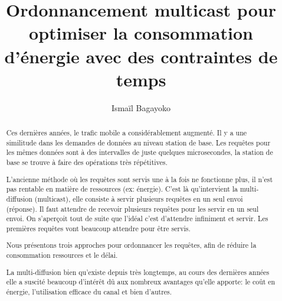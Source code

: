 \documentclass[runningheads]{llncs}
\begin{document}
%
\title{Ordonnancement multicast pour optimiser la consommation d'énergie avec des contraintes de temps}
%
%
\author{Isma\"il Bagayoko}
%
%
%
\maketitle              %
%
\begin{abstract}
Ces dernières années, le trafic mobile a considérablement augmenté. 
Il y a une similitude dans les demandes de données au niveau station 
de base. Les requêtes pour les mêmes données sont à des intervalles 
de juste quelques microsecondes, la station de base se trouve à faire des 
opérations très répétitives. 

L'ancienne méthode où les requêtes sont servis une à la fois ne 
fonctionne plus, il n'est pas rentable en matière de ressources 
(ex: énergie). C'est là qu'intervient la multi-diffusion (multicast), 
elle consiste à servir plusieurs requêtes en un seul envoi (réponse).
Il faut attendre de recevoir  plusieurs requêtes pour les servir en 
un seul envoi. On s'aperçoit tout de suite que l'idéal c'est d'attendre 
infiniment et servir. Les premières requêtes vont beaucoup attendre pour 
être servis.

Nous présentons trois approches pour ordonnancer les requêtes, afin de 
réduire la consommation ressources et le délai.


La multi-diffusion bien qu'existe depuis très longtemps, au cours des 
dernières années elle a suscité beaucoup d'intérêt dû aux nombreux 
avantages qu'elle apporte: le coût en énergie, l'utilisation efficace 
du canal et bien d'autres.


\end{abstract}
%
%
%
\end{document}
